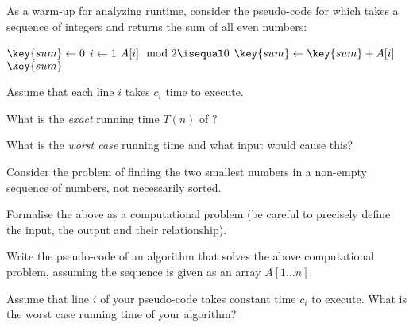 \documentclass{article}
\begin{document}
\thispagestyle{fancy}


\begin{Exercise}
    \noindent
    As a warm-up for analyzing runtime, consider the pseudo-code for
     which takes a sequence of integers and returns the
    sum of all even numbers:

    \begin{codebox}
        \li $\key{sum} \gets 0$
        \li \For $i \gets 1$ \To {} \Do
            \li \If $A[i] \mod{2} \isequal 0$ \Then
                \li $\key{sum} \gets \key{sum} + A[i]$
            \End
        \End
        \li \Return $\key{sum}$
    \end{codebox}

    \noindent
    Assume that each line $i$ takes $c_i$ time to execute.

    \Question
    What is the \textit{exact} running time $T(n)$ of
    ?

    \Question
    What is the \textit{worst case} running time and what input would cause
    this?

\end{Exercise}

\medskip

\begin{Exercise}
    \noindent
    Consider the problem of finding the two smallest numbers in a non-empty
    sequence of numbers, not necessarily sorted.

    \Question
    Formalise the above as a computational problem (be careful to precisely
    define the input, the output and their relationship).

    \Question
    Write the pseudo-code of an algorithm that solves the above computational
    problem, assuming the sequence is given as an array $A[1\ldots n]$.

    \Question
    Assume that line $i$ of your pseudo-code takes constant time $c_i$ to
    execute. What is the worst case running time of your algorithm?
\end{Exercise}

\medskip
\end{document}
